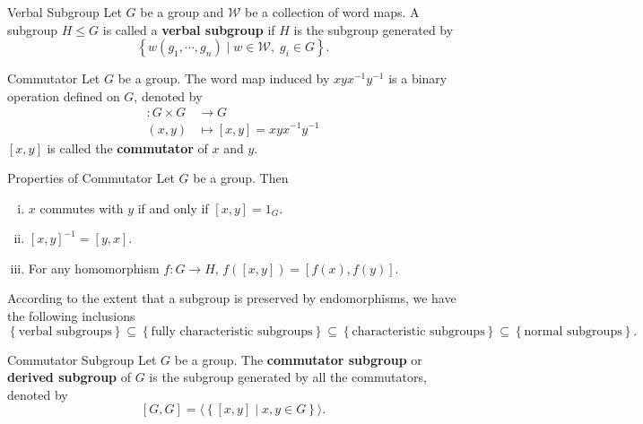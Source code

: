 \begin{definition}{Verbal Subgroup}{}
    Let $G$ be a group and $\mathcal{W}$ be a collection of word maps. A subgroup $H\le G$ is called a \textbf{verbal subgroup} if $H$ is the subgroup generated by
    $$
        \left\{ w(g_1,\cdots,g_n)\mid w\in\mathcal{W},\; g_i\in G \right\}.
    $$
\end{definition}

\begin{definition}{Commutator}{}
    Let $G$ be a group. The word map induced by $xyx^{-1}y^{-1}$ is a binary operation defined on $G$, denoted by
    \begin{align*}
        [\cdot,\cdot]:G\times G & \longrightarrow G                \\
        (x,y)                   & \longmapsto [x,y]=xyx^{-1}y^{-1}
    \end{align*}
    $[x,y]$ is called the \textbf{commutator} of $x$ and $y$.
\end{definition}

\begin{proposition}{Properties of Commutator}{}
    Let $G$ be a group. Then
    \begin{enumerate}[(i)]
        \item $x$ commutes with $y$ if and only if $[x,y]=1_G$.
        \item $[x,y]^{-1}=[y,x]$.
        \item For any homomorphism $f:G\to H$, $f([x,y])=[f(x),f(y)]$.
    \end{enumerate}
\end{proposition}

\begin{proposition}{}{}
    According to the extent that a subgroup is preserved by endomorphisms, we have the following inclusions
    \[
        \left\{\text{verbal subgroups}\right\}\subseteq \left\{\text{fully characteristic subgroups}\right\}\subseteq \left\{\text{characteristic subgroups}\right\}\subseteq\left\{\text{normal subgroups}\right\}.
    \]
\end{proposition}


\begin{definition}{Commutator Subgroup}{}
    Let $G$ be a group. The \textbf{commutator subgroup} or \textbf{derived subgroup} of $G$ is the subgroup generated by all the commutators, denoted by
    $$
        [G,G]=\langle \left\{[x,y]\mid x,y\in G \right\}\rangle.
    $$
\end{definition}

